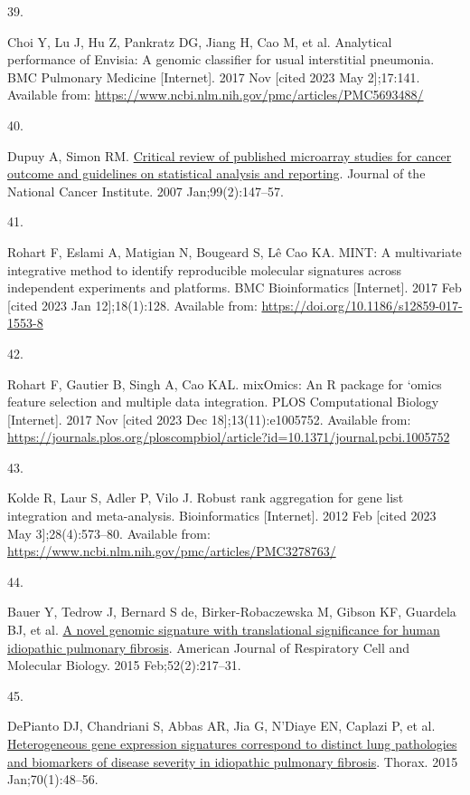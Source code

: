 \documentclass[
]{article}
\newlength{\cslhangindent}
\newlength{\csllabelwidth}
\newenvironment{CSLReferences}[2] %
 {\begin{list}{}{%
  \setlength{\itemindent}{0pt}
  \setlength{\leftmargin}{0pt}
  \setlength{\parsep}{0pt}
  \ifodd #1
   \setlength{\leftmargin}{\cslhangindent}
   \setlength{\itemindent}{-1\cslhangindent}
  \fi
  \setlength{\itemsep}{#2\baselineskip}}}
 {\end{list}}
\newcommand{\CSLLeftMargin}[1]{\parbox[t]{\csllabelwidth}{\strut#1\strut}}
\newcommand{\CSLRightInline}[1]{\parbox[t]{\linewidth - \csllabelwidth}{\strut#1\strut}}
\begin{document}
\begin{CSLReferences}{0}{1}
\CSLLeftMargin{39. }%
\CSLRightInline{Choi Y, Lu J, Hu Z, Pankratz DG, Jiang H, Cao M, et al. Analytical performance of {Envisia}: A genomic classifier for usual interstitial pneumonia. BMC Pulmonary Medicine {[}Internet{]}. 2017 Nov {[}cited 2023 May 2{]};17:141. Available from: \url{https://www.ncbi.nlm.nih.gov/pmc/articles/PMC5693488/}}

\CSLLeftMargin{40. }%
\CSLRightInline{Dupuy A, Simon RM. \href{https://doi.org/10.1093/jnci/djk018}{Critical review of published microarray studies for cancer outcome and guidelines on statistical analysis and reporting}. Journal of the National Cancer Institute. 2007 Jan;99(2):147--57. }

\CSLLeftMargin{41. }%
\CSLRightInline{Rohart F, Eslami A, Matigian N, Bougeard S, Lê Cao KA. {MINT}: A multivariate integrative method to identify reproducible molecular signatures across independent experiments and platforms. BMC Bioinformatics {[}Internet{]}. 2017 Feb {[}cited 2023 Jan 12{]};18(1):128. Available from: \url{https://doi.org/10.1186/s12859-017-1553-8}}

\CSLLeftMargin{42. }%
\CSLRightInline{Rohart F, Gautier B, Singh A, Cao KAL. {mixOmics}: {An} {R} package for `omics feature selection and multiple data integration. PLOS Computational Biology {[}Internet{]}. 2017 Nov {[}cited 2023 Dec 18{]};13(11):e1005752. Available from: \url{https://journals.plos.org/ploscompbiol/article?id=10.1371/journal.pcbi.1005752}}

\CSLLeftMargin{43. }%
\CSLRightInline{Kolde R, Laur S, Adler P, Vilo J. Robust rank aggregation for gene list integration and meta-analysis. Bioinformatics {[}Internet{]}. 2012 Feb {[}cited 2023 May 3{]};28(4):573--80. Available from: \url{https://www.ncbi.nlm.nih.gov/pmc/articles/PMC3278763/}}

\CSLLeftMargin{44. }%
\CSLRightInline{Bauer Y, Tedrow J, Bernard S de, Birker-Robaczewska M, Gibson KF, Guardela BJ, et al. \href{https://doi.org/10.1165/rcmb.2013-0310OC}{A novel genomic signature with translational significance for human idiopathic pulmonary fibrosis}. American Journal of Respiratory Cell and Molecular Biology. 2015 Feb;52(2):217--31. }

\CSLLeftMargin{45. }%
\CSLRightInline{DePianto DJ, Chandriani S, Abbas AR, Jia G, N'Diaye EN, Caplazi P, et al. \href{https://doi.org/10.1136/thoraxjnl-2013-204596}{Heterogeneous gene expression signatures correspond to distinct lung pathologies and biomarkers of disease severity in idiopathic pulmonary fibrosis}. Thorax. 2015 Jan;70(1):48--56. }


\end{CSLReferences}
\end{document}
